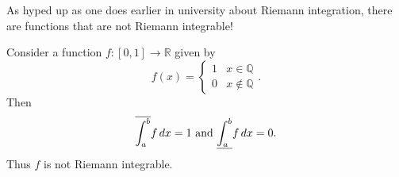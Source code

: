 \documentclass[notoc,notitlepage]{tufte-book}
\begin{document}
As hyped up as one does earlier in university about Riemann integration,
there are functions that are not Riemann integrable!

\begin{eg}
  Consider a function $f : [0, 1] \to \mathbb{R}$ given by
  \begin{equation*}
    f(x) = \begin{cases}
      1 & x \in \mathbb{Q} \\
      0 & x \notin \mathbb{Q}
    \end{cases}.
  \end{equation*}
  Then
  \begin{equation*}
    \overline{\int_{a}^{b}} f \mathop{}\!d{x} = 1 \text{ and }
    \underline{\int_{a}^{b}} f \mathop{}\!d{x} = 0.
  \end{equation*}
  Thus $f$ is not Riemann integrable.
\end{eg}
\end{document}
